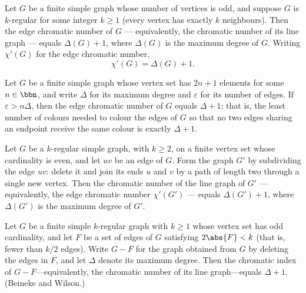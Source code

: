 \begin{theorem}
\label{SimpleGraph.edgeChromaticNumber_eq_maxDegree_add_one_of_regular_odd_card}
Let $G$ be a finite simple graph whose number of vertices is odd, and suppose $G$ is
$k$-regular for some integer $k \ge 1$ (every vertex has exactly $k$ neighbours). Then
the edge chromatic number of $G$ — equivalently, the chromatic number of its line graph
— equals $\Delta(G) + 1$, where $\Delta(G)$ is the maximum degree of $G$. Writing
$\chi'(G)$ for the edge chromatic number, \[\chi'(G) = \Delta(G) + 1.\]
\end{theorem}

\begin{theorem}
\label{SimpleGraph.edgeChromaticNumber_eq_maxDegree_add_one_of_card_edges_gt}
Let $G$ be a finite simple graph whose vertex set has $2n+1$ elements for some $n \in
\bbn$, and write $\Delta$ for its maximum degree and $\varepsilon$ for its number of
edges. If $\varepsilon > n\Delta$, then the edge chromatic number of $G$ equals $\Delta
+ 1$; that is, the least number of colours needed to colour the edges of $G$ so that no
two edges sharing an endpoint receive the same colour is exactly $\Delta + 1$.
\end{theorem}

\begin{theorem}
\label{SimpleGraph.edgeChromaticNumber_subdivide_eq_maxDegree_add_one}
Let $G$ be a $k$-regular simple graph, with $k \ge 2$, on a finite vertex set whose
cardinality is even, and let $uv$ be an edge of $G$. Form the graph $G'$ by subdividing
the edge $uv$: delete it and join its ends $u$ and $v$ by a path of length two through a
single new vertex. Then the chromatic number of the line graph of $G'$ — equivalently,
the edge chromatic number $\chi'(G')$ — equals $\Delta(G') + 1$, where $\Delta(G')$ is
the maximum degree of $G'$.
\end{theorem}

\begin{theorem}
\label{SimpleGraph.edgeChromaticNumber_deleteEdges_eq_maxDegree_add_one}
Let $G$ be a finite simple $k$-regular graph with $k \ge 1$ whose vertex set has odd
cardinality, and let $F$ be a set of edges of $G$ satisfying $2\abs{F} < k$ (that is,
fewer than $k/2$ edges). Write $G - F$ for the graph obtained from $G$ by deleting the
edges in $F$, and let $\Delta$ denote its maximum degree. Then the chromatic index of $G
- F$—equivalently, the chromatic number of its line graph—equals $\Delta + 1$. (Beineke
and Wilson.)
\end{theorem}

